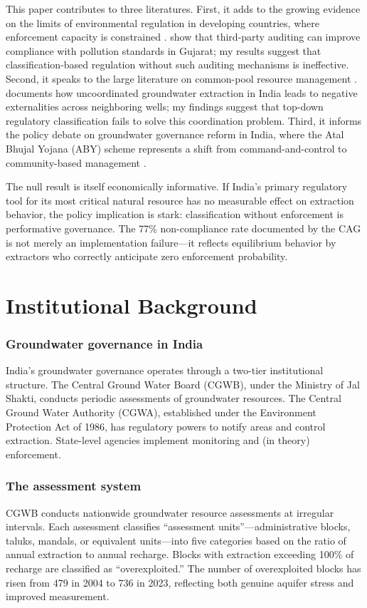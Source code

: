 \documentclass[12pt]{article}
\begin{document}
This paper contributes to three literatures. First, it adds to the growing evidence on the limits of environmental regulation in developing countries, where enforcement capacity is constrained \citep{duflo2013truth, greenstone2014environmental, he2020watering}. \citet{duflo2013truth} show that third-party auditing can improve compliance with pollution standards in Gujarat; my results suggest that classification-based regulation without such auditing mechanisms is ineffective. Second, it speaks to the large literature on common-pool resource management \citep{ostrom1990governing, sekhri2014wells}. \citet{sekhri2014wells} documents how uncoordinated groundwater extraction in India leads to negative externalities across neighboring wells; my findings suggest that top-down regulatory classification fails to solve this coordination problem. Third, it informs the policy debate on groundwater governance reform in India, where the Atal Bhujal Yojana (ABY) scheme represents a shift from command-and-control to community-based management \citep{worldbank2020atal}.

The null result is itself economically informative. If India's primary regulatory tool for its most critical natural resource has no measurable effect on extraction behavior, the policy implication is stark: classification without enforcement is performative governance. The 77\% non-compliance rate documented by the CAG is not merely an implementation failure---it reflects equilibrium behavior by extractors who correctly anticipate zero enforcement probability.

\section{Institutional Background}

\subsubsection*{Groundwater governance in India} India's groundwater governance operates through a two-tier institutional structure. The Central Ground Water Board (CGWB), under the Ministry of Jal Shakti, conducts periodic assessments of groundwater resources. The Central Ground Water Authority (CGWA), established under the Environment Protection Act of 1986, has regulatory powers to notify areas and control extraction. State-level agencies implement monitoring and (in theory) enforcement.

\subsubsection*{The assessment system} CGWB conducts nationwide groundwater resource assessments at irregular intervals. Each assessment classifies ``assessment units''---administrative blocks, taluks, mandals, or equivalent units---into five categories based on the ratio of annual extraction to annual recharge. Blocks with extraction exceeding 100\% of recharge are classified as ``overexploited.'' The number of overexploited blocks has risen from 479 in 2004 to 736 in 2023, reflecting both genuine aquifer stress and improved measurement.
\end{document}
